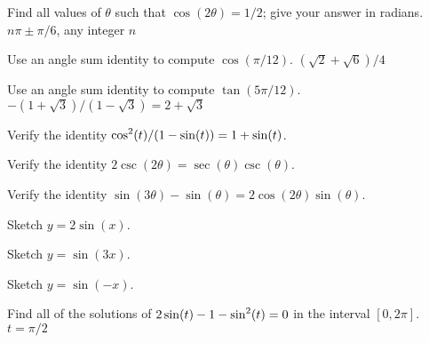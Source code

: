 \exercise Find all values of $\theta$ such that
$\cos(2\theta) = 1/2$; give your answer in radians.
\answer $n\pi\pm\pi/6$, any integer $n$
\endanswer
\endexercise

\exercise Use an angle sum identity to compute
  $\cos(\pi/12)$.
\answer $(\sqrt2+\sqrt6)/4$
\endanswer
\endexercise

\exercise Use an angle sum identity to compute
  $\tan(5\pi/12)$.
\answer $-(1+\sqrt3)/(1-\sqrt3)=2+\sqrt3$
\endanswer
\endexercise

\exercise Verify the identity $\displaystyle \cos^2(t)/(1-\sin(t)) =
  1+\sin(t)$.
\endexercise

\exercise Verify the identity $2\csc(2\theta)=\sec(\theta)\csc(\theta)$.
\endexercise

\exercise Verify the identity $\sin(3\theta) - \sin(\theta) = 2\cos(2\theta)
  \sin(\theta)$.
\endexercise

\exercise Sketch $y=2\sin(x)$.
\endexercise

\exercise Sketch $y=\sin(3x)$.
\endexercise

\exercise Sketch $y=\sin(-x)$.
\endexercise

\exercise Find all of the solutions of $\displaystyle 2\sin(t) -1 -\sin^2(t) =0$ in the
 interval $[0,2\pi]$.
\answer $t=\pi/2$
\endanswer
\endexercise

\endexercises
